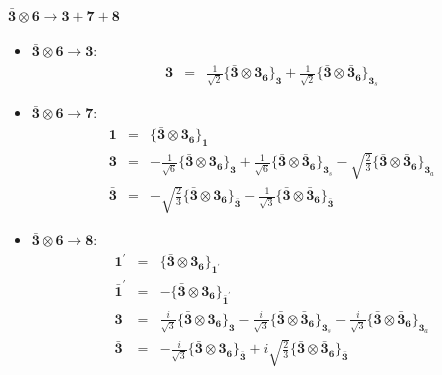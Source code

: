 \documentclass[english]{article}
\newcommand{\subcg}[3]{\big\{ {#1}\otimes{#2}\big\}^{}_{#3}}
\newcommand{\rep}[1]{\mathbf{#1}}
\begin{document}
\paragraph*{\Large $\rep{\bar{3}}\otimes\rep{6}\to\rep{3}+\rep{7}+\rep{8}$}
\begin{itemize}
\item $\rep{\bar{3}}\otimes\rep{6}\to\rep{3}$:
\begin{eqnarray*}
\rep{3} &=& \frac{1}{\sqrt{2}}\subcg{\rep{\bar{3}}}{\rep{3}_{\rep{6}}}{\rep{3}}+\frac{1}{\sqrt{2}}\subcg{\rep{\bar{3}}}{\rep{\bar{3}}_{\rep{6}}}{\rep{3}_{s}}
\end{eqnarray*}
\item $\rep{\bar{3}}\otimes\rep{6}\to\rep{7}$:
\begin{eqnarray*}
\rep{1} &=& \subcg{\rep{\bar{3}}}{\rep{3}_{\rep{6}}}{\rep{1}}
\\
\rep{3} &=& -\frac{1}{\sqrt{6}}\subcg{\rep{\bar{3}}}{\rep{3}_{\rep{6}}}{\rep{3}}+\frac{1}{\sqrt{6}}\subcg{\rep{\bar{3}}}{\rep{\bar{3}}_{\rep{6}}}{\rep{3}_{s}}-\sqrt{\frac{2}{3}}\subcg{\rep{\bar{3}}}{\rep{\bar{3}}_{\rep{6}}}{\rep{3}_{a}}
\\
\rep{\bar{3}} &=& -\sqrt{\frac{2}{3}}\subcg{\rep{\bar{3}}}{\rep{3}_{\rep{6}}}{\rep{\bar{3}}}-\frac{1}{\sqrt{3}}\subcg{\rep{\bar{3}}}{\rep{\bar{3}}_{\rep{6}}}{\rep{\bar{3}}}
\end{eqnarray*}
\item $\rep{\bar{3}}\otimes\rep{6}\to\rep{8}$:
\begin{eqnarray*}
\rep{1^{\prime}} &=& \subcg{\rep{\bar{3}}}{\rep{3}_{\rep{6}}}{\rep{1^{\prime}}}
\\
\rep{\bar{1}^{\prime}} &=& -\subcg{\rep{\bar{3}}}{\rep{3}_{\rep{6}}}{\rep{\bar{1}^{\prime}}}
\\
\rep{3} &=& \frac{i}{\sqrt{3}}\subcg{\rep{\bar{3}}}{\rep{3}_{\rep{6}}}{\rep{3}}-\frac{i}{\sqrt{3}}\subcg{\rep{\bar{3}}}{\rep{\bar{3}}_{\rep{6}}}{\rep{3}_{s}}-\frac{i}{\sqrt{3}}\subcg{\rep{\bar{3}}}{\rep{\bar{3}}_{\rep{6}}}{\rep{3}_{a}}
\\
\rep{\bar{3}} &=& -\frac{i}{\sqrt{3}}\subcg{\rep{\bar{3}}}{\rep{3}_{\rep{6}}}{\rep{\bar{3}}}+i \sqrt{\frac{2}{3}}\subcg{\rep{\bar{3}}}{\rep{\bar{3}}_{\rep{6}}}{\rep{\bar{3}}}
\end{eqnarray*}
\end{itemize}
\end{document}
